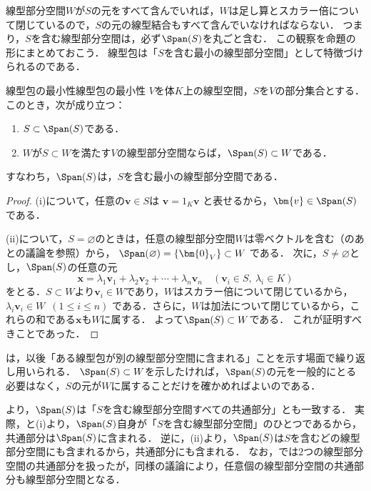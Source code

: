 線型部分空間$W$が$S$の元をすべて含んでいれば，$W$は足し算とスカラー倍について閉じているので，$S$の元の線型結合もすべて含んでいなければならない．
つまり，$S$を含む線型部分空間は，必ず$\Span(S)$を丸ごと含む．
この観察を命題の形にまとめておこう．
線型包は「$S$を含む最小の線型部分空間」として特徴づけられるのである．

\begin{prop}{線型包の最小性}{線型包の最小性}
  $V$を体$K$上の線型空間，$S$を$V$の部分集合とする．このとき，次が成り立つ：
  \begin{enumerate}[label=(\roman*),leftmargin=3.2em]
    \item $S \subset \Span(S)$である．
    \item $W$が$S \subset W$を満たす$V$の線型部分空間ならば，$\Span(S) \subset W$である．
  \end{enumerate}
  すなわち，$\Span(S)$は，$S$を含む最小の線型部分空間である．
\end{prop}

\begin{tleftbar}
\begin{proof}
  (i)について，任意の$\bm{v} \in S$は
  $\bm{v} = 1_K \bm{v}$
  と表せるから，$\bm{v} \in \Span(S)$である．

  (ii)について，$S = \varnothing$のときは，任意の線型部分空間$W$は零ベクトルを含む（のあとの議論を参照）から，
  $\Span(\varnothing) = \{\bm{0}_V\} \subset W$
  である．
  次に，$S \neq \varnothing$とし，$\Span(S)$の任意の元
  \[
    \bm{x} = \lambda_1 \bm{v}_1 + \lambda_2 \bm{v}_2 + \cdots + \lambda_n \bm{v}_n
    \quad (\bm{v}_i \in S,\ \lambda_i \in K)
  \]
  をとる．$S \subset W$より$\bm{v}_i \in W$であり，$W$はスカラー倍について閉じているから，
  $\lambda_i \bm{v}_i \in W$~$(1 \le i \le n)$
  である．さらに，$W$は加法について閉じているから，これらの和である$\bm{x}$も$W$に属する．
  よって$\Span(S) \subset W$である．
  これが証明すべきことであった．
\end{proof}
\end{tleftbar}

は，以後「ある線型包が別の線型部分空間に含まれる」ことを示す場面で繰り返し用いられる．
$\Span(S)\subset W$を示したければ，$\Span(S)$の元を一般的にとる必要はなく，$S$の元が$W$に属することだけを確かめればよいのである．

\begin{remark}[線型包と共通部分]
より，$\Span(S)$は「$S$を含む線型部分空間すべての共通部分」とも一致する．
実際，と(i)より，$\Span(S)$自身が「$S$を含む線型部分空間」のひとつであるから，共通部分は$\Span(S)$に含まれる．
逆に，(ii)より，$\Span(S)$は$S$を含むどの線型部分空間にも含まれるから，共通部分にも含まれる．
なお，では$2$つの線型部分空間の共通部分を扱ったが，同様の議論により，任意個の線型部分空間の共通部分も線型部分空間となる．
\end{remark}

